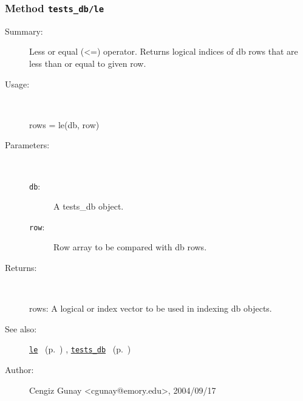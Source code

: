 \subsubsection[Method \texttt{le}]{Method \texttt{tests\_db/le}}%
%
\label{ref_tests_db__le}%
\hypertarget{ref_tests_db__le}{}%
\begin{description}
\item[Summary:]Less or equal (<=) operator. Returns logical indices of db rows 
	that are less than or equal to given row.
%
\item[Usage:]~%
\begin{lyxcode}%
rows = le(db, row)
%
\end{lyxcode}%
%
%
\item[Parameters:]~
\begin{description}%
\item[\texttt{db}:]
 A tests\_db object.
\item[\texttt{row}:]
 Row array to be compared with db rows.
\end{description}%
%
\item[Returns:]~

	rows: A logical or index vector to be used in indexing db objects. 
%
%
\item[See also:]%
\hyperlink{ref_le}{\texttt{le}}%
\ (p.~\pageref{ref_le})%
%
, \hyperlink{ref_tests_db}{\texttt{tests\_db}}%
\ (p.~\pageref{ref_tests_db})%
%
%
\item[Author:]%
Cengiz Gunay <cgunay@emory.edu>, 2004/09/17%
\end{description}
\methodline%
